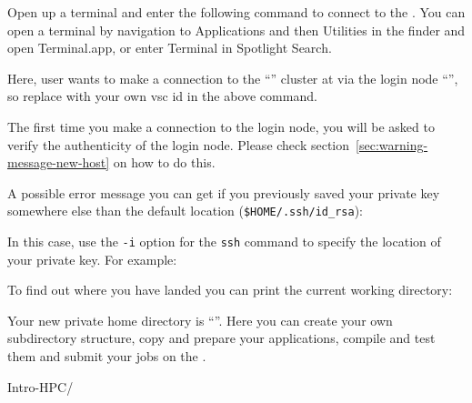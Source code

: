   Open up a terminal and enter the following command to connect to the \hpc.
  \ifmac
  You can open a terminal by navigation to Applications and then Utilities in the finder and open Terminal.app, or enter Terminal in Spotlight Search.
  \fi

\begin{prompt}
\end{prompt}

  Here, user \userid wants to make a connection to the ``\hpcname'' cluster at
  \university via the login node ``\loginnode'', so replace \userid with your own
  vsc id in the above command.

  The first time you make a connection to the login node, you will be asked to
  verify the authenticity of the login node. Please check section~\ref{sec:warning-message-new-host}
  on how to do this.

A possible error message you can get if you previously saved your private key
somewhere else than the default location (\lstinline|$HOME/.ssh/id_rsa|):

\begin{prompt}
\end{prompt}

In this case, use the \lstinline|-i| option for the \lstinline|ssh| command to specify the location
of your private key. For example:

\begin{prompt}
\end{prompt}

\fi

To find out where you have landed you can print the current working directory:

\begin{prompt}
\end{prompt}


Your new private home directory is ``\homedir''.
Here you can create your own subdirectory structure, copy and prepare your
applications, compile and test them and submit your jobs on the \hpc.

\begin{prompt}
Intro-HPC/
\end{prompt}

